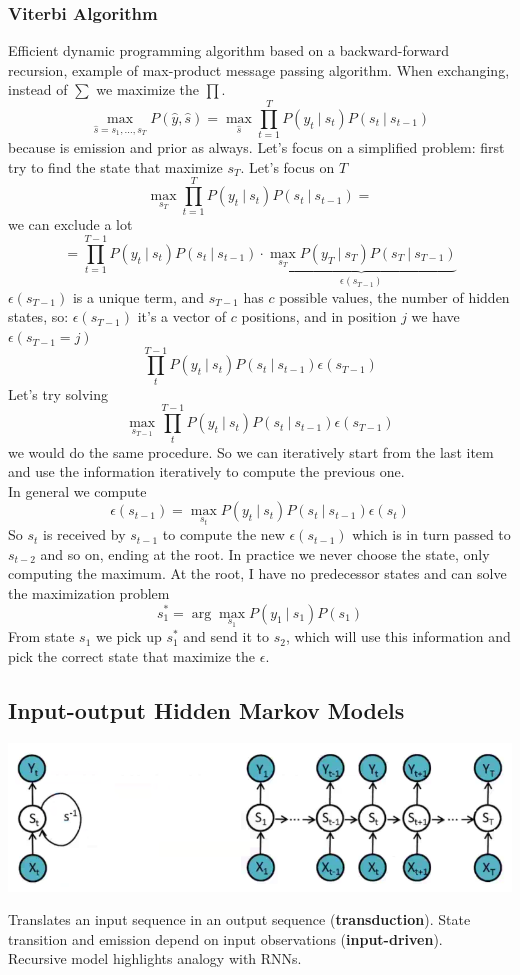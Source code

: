 \documentclass[10pt]{report}
\begin{document}
\subsubsection{Viterbi Algorithm} Efficient dynamic programming algorithm based on a backward-forward recursion, example of max-product message passing algorithm. When exchanging, instead of $\sum$ we maximize the $\prod$.
$$\max_{\hat{s} = s_1,\ldots,s_T} P(\hat{y},\hat{s}) = \max_{\hat{s}}\prod_{t=1}^T P(y_t\:|\:s_t)P(s_t\:|\:s_{t-1})$$
because is emission and prior as always. Let's focus on a simplified problem: first try to find the state that maximize $s_T$. Let's focus on $T$
$$\max_{s_T}\prod_{t=1}^T P(y_t\:|\:s_t)P(s_t\:|\:s_{t-1})=$$
we can exclude a lot
$$=\prod_{t=1}^{T-1} P(y_t\:|\:s_t)P(s_t\:|\:s_{t-1})\cdot\underset{\epsilon(s_{T-1})}{\underbrace{\max_{s_T}P(y_T\:|\:s_T)P(s_T\:|\:s_{T-1})}}$$
$\epsilon(s_{T-1})$ is a unique term, and $s_{T-1}$ has $c$ possible values, the number of hidden states, so: $\epsilon(s_{T-1})$ it's a vector of $c$ positions, and in position $j$ we have $\epsilon(s_{T-1} = j)$
$$\prod_t^{T-1} P(y_t\:|\:s_t)P(s_t\:|\:s_{t-1})\epsilon(s_{T-1})$$
Let's try solving 
$$\max_{s_{T-1}} \prod_t^{T-1} P(y_t\:|\:s_t)P(s_t\:|\:s_{t-1})\epsilon(s_{T-1})$$
we would do the same procedure. So we can iteratively start from the last item and use the information iteratively to compute the previous one.\\
In general we compute $$\epsilon(s_{t-1}) = \max_{s_t} P(y_t\:|\:s_t)P(s_t\:|\:s_{t-1})\epsilon(s_t)$$
So $s_t$ is received by $s_{t-1}$ to compute the new $\epsilon(s_{t-1})$ which is in turn passed to $s_{t-2}$ and so on, ending at the root. In practice we never choose the state, only computing the maximum. At the root, I have no predecessor states and can solve the maximization problem
$$s_1^* = \arg\max_{s_1}P(y_1\:|\:s_1)P(s_1)$$
From state $s_1$ we pick up $s_1^*$ and send it to $s_2$, which will use this information and pick the correct state that maximize the $\epsilon$.
\subsection{Input-output Hidden Markov Models}
\begin{center}
	\includegraphics[scale=0.5]{31.png}
\end{center}
Translates an input sequence in an output sequence (\textbf{transduction}). State transition and emission depend on input observations (\textbf{input-driven}).\\
Recursive model highlights analogy with RNNs.
\end{document}
